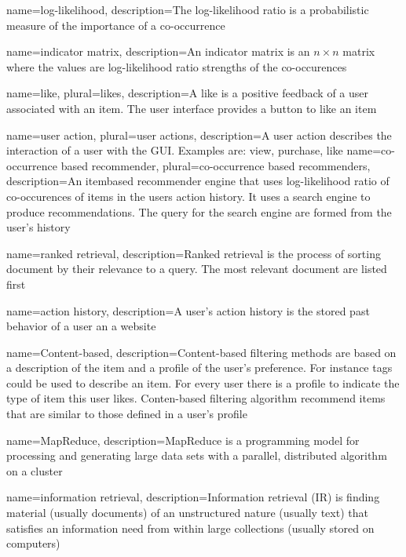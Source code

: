 {
name={log-likelihood},
description={The log-likelihood ratio is a probabilistic measure of the importance of a co-occurrence}
}

{
name={indicator matrix},
description={An indicator matrix is an $n \times n$ matrix where the values are log-likelihood ratio strengths of the co-occurences}
}

{
name={like},
plural={likes},
description={A like is a positive feedback of a user associated with an item. The user interface provides a button to like an item}
}

{
name={user action},
plural={user actions},
description={A user action describes the interaction of a user with the GUI. Examples are: view, purchase, like }
}
{
name={co-occurrence based recommender},
plural={co-occurrence based recommenders},
description={An itembased recommender engine that uses log-likelihood ratio of co-occurences of items in the users action history. It uses a search engine to produce recommendations. The query for the search engine are formed from the user's history }
}

{
name={ranked retrieval},
description={Ranked retrieval is the process of sorting document by their relevance to a query. The most relevant document are listed first}
}

{
name={action history},
description={A user's action history is the stored past behavior of a user an a website}
}

{
name={Content-based},
description={Content-based filtering methods are based on a description of the item and a profile of the user’s preference. For instance tags could be used to describe an item. For every user there is a profile to indicate the type of item this user likes. Conten-based filtering algorithm recommend items that are similar to those defined in a user's profile}
}

{
name={MapReduce},
description={MapReduce is a programming model for processing and generating large data sets with a parallel, distributed algorithm on a cluster}
}

{
name={information retrieval},
description={Information retrieval (IR) is finding material (usually documents) of an
unstructured nature (usually text) that satisfies an information need from
within large collections (usually stored on computers) \cite{Manning}
}
}

